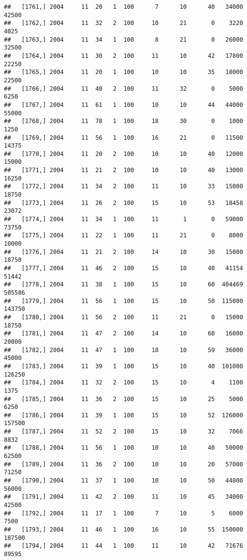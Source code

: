 \documentclass{article}\usepackage[]{graphicx}\usepackage[]{color}
\makeatletter
\newenvironment{kframe}{%
 \def\at@end@of@kframe{}%
 \ifinner\ifhmode%
  \def\at@end@of@kframe{\end{minipage}}%
  \begin{minipage}{\columnwidth}%
 \fi\fi%
 \def\FrameCommand##1{\hskip\@totalleftmargin \hskip-\fboxsep
 \colorbox{shadecolor}{##1}\hskip-\fboxsep
     \hskip-\linewidth \hskip-\@totalleftmargin \hskip\columnwidth}%
 \MakeFramed {\advance\hsize-\width
   \@totalleftmargin\z@ \linewidth\hsize
   \@setminipage}}%
 {\par\unskip\endMakeFramed%
 \at@end@of@kframe}
\newenvironment{knitrout}{}{} %
\makeatother
\begin{document}
\begin{knitrout}
\begin{kframe}
\begin{verbatim}
##   [1761,] 2004     11  20   1  100      7      10      40   34000   42500
##   [1762,] 2004     11  32   2  100     10      21       0    3220    4025
##   [1763,] 2004     11  34   1  100      8      21       0   26000   32500
##   [1764,] 2004     11  30   2  100     11      10      42   17800   22250
##   [1765,] 2004     11  20   1  100     10      10      35   18000   22500
##   [1766,] 2004     11  40   2  100     11      32       0    5000    6250
##   [1767,] 2004     11  61   1  100     10      10      44   44000   55000
##   [1768,] 2004     11  78   1  100     18      30       0    1000    1250
##   [1769,] 2004     11  56   1  100     16      21       0   11500   14375
##   [1770,] 2004     11  20   2  100     10      10      40   12000   15000
##   [1771,] 2004     11  21   2  100     10      10      40   13000   16250
##   [1772,] 2004     11  34   2  100     11      10      33   15000   18750
##   [1773,] 2004     11  26   2  100     15      10      53   18458   23072
##   [1774,] 2004     11  34   1  100     11       1       0   59000   73750
##   [1775,] 2004     11  22   1  100     11      21       0    8000   10000
##   [1776,] 2004     11  21   2  100     14      10      30   15000   18750
##   [1777,] 2004     11  46   2  100     15      10      40   41154   51442
##   [1778,] 2004     11  38   1  100     15      10      60  404469  505586
##   [1779,] 2004     11  56   1  100     15      10      50  115000  143750
##   [1780,] 2004     11  56   2  100     11      21       0   15000   18750
##   [1781,] 2004     11  47   2  100     14      10      60   16000   20000
##   [1782,] 2004     11  47   1  100     18      10      59   36000   45000
##   [1783,] 2004     11  39   1  100     15      10      40  101000  126250
##   [1784,] 2004     11  32   2  100     15      10       4    1100    1375
##   [1785,] 2004     11  36   2  100     15      10      25    5000    6250
##   [1786,] 2004     11  39   1  100     15      10      52  126000  157500
##   [1787,] 2004     11  52   2  100     15      10      32    7066    8832
##   [1788,] 2004     11  56   1  100     10      10      40   50000   62500
##   [1789,] 2004     11  36   2  100     10      10      20   57000   71250
##   [1790,] 2004     11  37   1  100     10      10      50   44800   56000
##   [1791,] 2004     11  42   2  100     11      10      45   34000   42500
##   [1792,] 2004     11  17   1  100      7      10       5    6000    7500
##   [1793,] 2004     11  46   1  100     16      10      55  150000  187500
##   [1794,] 2004     11  44   1  100     11      10      42   71676   89595

\end{verbatim}
\end{kframe}
\end{knitrout}
\end{document}
